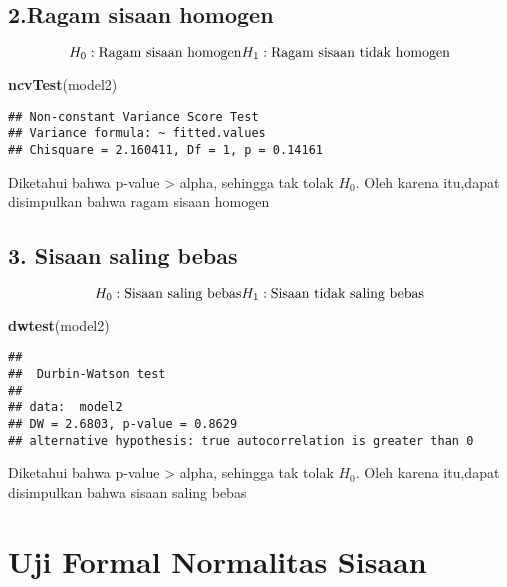 \documentclass[
]{article}
\newenvironment{Shaded}{\begin{snugshade}}{\end{snugshade}}
\newcommand{\FunctionTok}[1]{\textcolor[rgb]{0.13,0.29,0.53}{\textbf{#1}}}
\newcommand{\NormalTok}[1]{#1}
\begin{document}
\hypertarget{ragam-sisaan-homogen-1}{%
\subsection{2.Ragam sisaan homogen}\label{ragam-sisaan-homogen-1}}

\[
H_0 : \text{Ragam sisaan homogen}\\H_1 : \text{Ragam sisaan tidak homogen}
\]

\begin{Shaded}
\begin{Highlighting}[]
\FunctionTok{ncvTest}\NormalTok{(model2)}
\end{Highlighting}
\end{Shaded}

\begin{verbatim}
## Non-constant Variance Score Test 
## Variance formula: ~ fitted.values 
## Chisquare = 2.160411, Df = 1, p = 0.14161
\end{verbatim}

Diketahui bahwa p-value \textgreater{} alpha, sehingga tak tolak
\(H_0\). Oleh karena itu,dapat disimpulkan bahwa ragam sisaan homogen

\hypertarget{sisaan-saling-bebas-1}{%
\subsection{3. Sisaan saling bebas}\label{sisaan-saling-bebas-1}}

\[
H_0 : \text{Sisaan saling bebas}\\H_1 : \text{Sisaan tidak saling bebas}
\]

\begin{Shaded}
\begin{Highlighting}[]
\FunctionTok{dwtest}\NormalTok{(model2)}
\end{Highlighting}
\end{Shaded}

\begin{verbatim}
## 
##  Durbin-Watson test
## 
## data:  model2
## DW = 2.6803, p-value = 0.8629
## alternative hypothesis: true autocorrelation is greater than 0
\end{verbatim}

Diketahui bahwa p-value \textgreater{} alpha, sehingga tak tolak
\(H_0\). Oleh karena itu,dapat disimpulkan bahwa sisaan saling bebas

\hypertarget{uji-formal-normalitas-sisaan-1}{%
\section{Uji Formal Normalitas
Sisaan}\label{uji-formal-normalitas-sisaan-1}}
\end{document}
